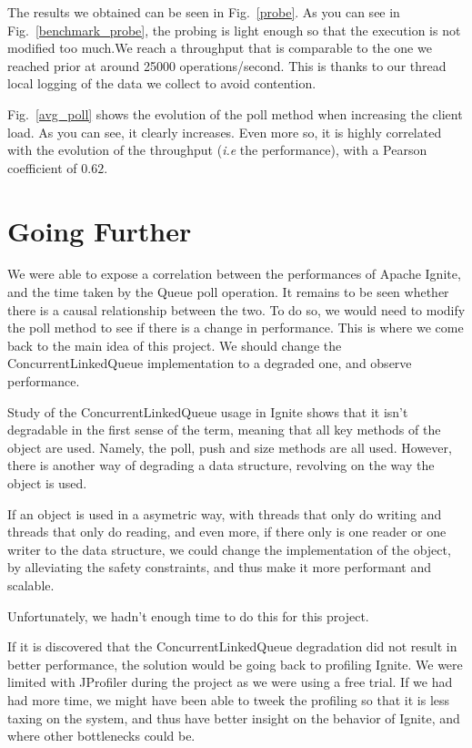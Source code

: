 \documentclass[conference]{IEEEtran}
\begin{document}
The results we obtained can be seen in Fig.~\ref{probe}. As you can see in Fig.~\ref{benchmark_probe}, the probing is light enough so that the execution is not modified too much.We reach a throughput that is comparable to the one we reached prior at around 25000 operations/second. This is thanks to our thread local logging of the data we collect to avoid contention.

Fig.~\ref{avg_poll} shows the evolution of the poll method when increasing the client load. As you can see, it clearly increases. Even more so, it is highly correlated with the evolution of the throughput (\textit{i.e} the performance), with a Pearson coefficient \cite{pearson} of $0.62$.
\bigbreak


\section{Going Further}
We were able to expose a correlation between the performances of Apache Ignite, and the time taken by the Queue poll operation. It remains to be seen whether there is a causal relationship between the two. To do so, we would need to modify the poll method to see if there is a change in performance. This is where we come back to the main idea of this project. We should change the ConcurrentLinkedQueue implementation to a degraded one, and observe performance.

Study of the ConcurrentLinkedQueue usage in Ignite shows that it isn't degradable in the first sense of the term, meaning that all key methods of the object are used. Namely, the poll, push and size methods are all used. However, there is another way of degrading a data structure, revolving on the way the object is used.

If an object is used in a asymetric way, with threads that only do writing and threads that only do reading, and even more, if there only is one reader or one writer to the data structure, we could change the implementation of the object, by alleviating the safety constraints, and thus make it more performant and scalable.

Unfortunately, we hadn't enough time to do this for this project.

If it is discovered that the ConcurrentLinkedQueue degradation did not result in better performance, the solution would be going back to profiling Ignite. We were limited with JProfiler during the project as we were using a free trial. If we had had more time, we might have been able to tweek the profiling so that it is less taxing on the system, and thus have better insight on the behavior of Ignite, and where other bottlenecks could be.
\end{document}

